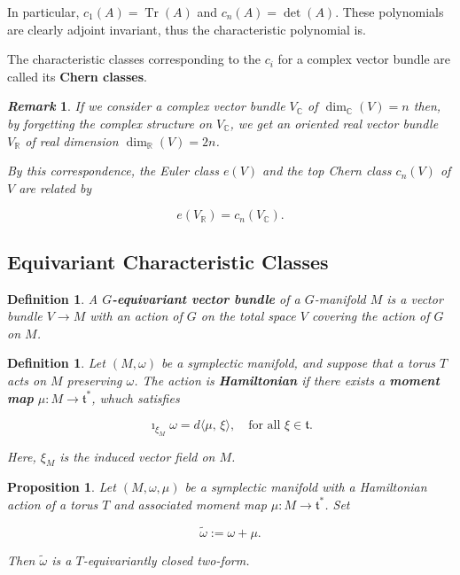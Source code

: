 \documentclass{article}
\newtheorem{prop}[theorem]{Proposition}
\newtheorem{defn}[theorem]{Definition\rm}
\newtheorem{remark}{\it Remark\/}
\newcommand{\ra}{\rightarrow}
\newcommand{\w}{\omega}
\newcommand{\RR}{\mathbb{R}}
\newcommand{\CC}{\mathbb{C}}
\newcommand{\mft}{\mathfrak{t}}
\DeclareMathOperator{\Tr}{Tr}
\begin{document}
In particular, $c_{1}(A) = \Tr(A)$ and $c_{n}(A) = \det(A)$. These polynomials are clearly adjoint invariant, thus the characteristic polynomial is.

The characteristic classes corresponding to the $c_{i}$ for a complex vector bundle are called its \textbf{Chern classes}.

\begin{remark}
	If we consider a complex vector bundle $V_{\CC}$ of $\dim_{\CC}(V) = n$ then, by forgetting the complex structure on $V_{\CC}$, we get an oriented real vector bundle $V_{\RR}$ of real dimension $\dim_{\RR}(V) = 2n$.
	
	By this correspondence, the Euler class $e(V)$ and the top Chern class $c_{n}(V)$ of $V$ are related by
	
	\begin{equation*}
		e(V_{\RR}) = c_{n}(V_{\CC}).
	\end{equation*}
	
\end{remark}

\subsection{Equivariant Characteristic Classes}

\begin{defn}
	A $G$\textbf{-equivariant vector bundle} of a $G$-manifold $M$ is a vector bundle $V \ra M$ with an action of $G$ on the total space $V$ covering the action of $G$ on $M$.
\end{defn}

\begin{defn}
	Let $(M, \w)$ be a symplectic manifold, and suppose that a torus $T$ acts on $M$ preserving $\w$. The action is \textbf{Hamiltonian} if there exists a \textbf{moment map} $\mu : M \ra \mft^{\ast}$, whuch satisfies
	
	\begin{equation*}
		\imath_{\xi_{M}}\w = d\langle \mu,\, \xi \rangle, \quad \text{for all } \xi \in \mft.
	\end{equation*}

	Here, $\xi_{M}$ is the induced vector field on $M$.
\end{defn}

\begin{prop}
	Let $(M, \w, \mu)$ be a symplectic manifold with a Hamiltonian action of a torus $T$ and associated moment map $\mu : M \ra \mft^{\ast}$. Set
	
	\begin{equation*}
		\tilde{\w} := \w + \mu.
	\end{equation*}
	
	Then $\tilde{\w}$ is a $T$-equivariantly closed two-form.
\end{prop}
\end{document}

